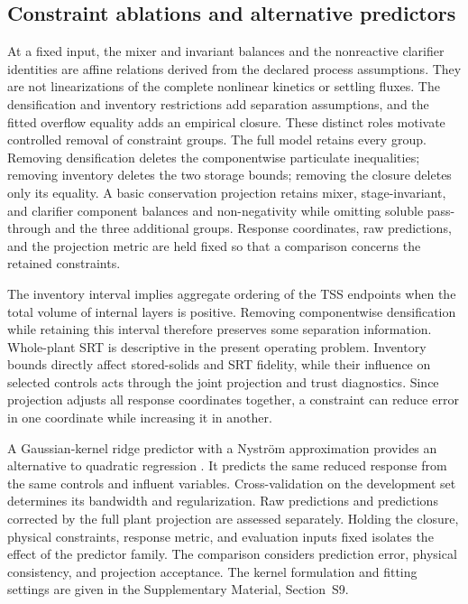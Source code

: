 \documentclass[a4paper,fleqn]{cas-sc}
\begin{document}
\subsection{Constraint ablations and alternative predictors}

At a fixed input, the mixer and invariant balances and the nonreactive clarifier identities are affine relations derived from the declared process assumptions. They are not linearizations of the complete nonlinear kinetics or settling fluxes. The densification and inventory restrictions add separation assumptions, and the fitted overflow equality adds an empirical closure. These distinct roles motivate controlled removal of constraint groups. The full model retains every group. Removing densification deletes the componentwise particulate inequalities; removing inventory deletes the two storage bounds; removing the closure deletes only its equality. A basic conservation projection retains mixer, stage-invariant, and clarifier component balances and non-negativity while omitting soluble pass-through and the three additional groups. Response coordinates, raw predictions, and the projection metric are held fixed so that a comparison concerns the retained constraints.

The inventory interval implies aggregate ordering of the TSS endpoints when the total volume of internal layers is positive. Removing componentwise densification while retaining this interval therefore preserves some separation information. Whole-plant SRT is descriptive in the present operating problem. Inventory bounds directly affect stored-solids and SRT fidelity, while their influence on selected controls acts through the joint projection and trust diagnostics. Since projection adjusts all response coordinates together, a constraint can reduce error in one coordinate while increasing it in another.

A Gaussian-kernel ridge predictor with a Nystr\"om approximation provides an alternative to quadratic regression \citep{WilliamsSeeger2001}. It predicts the same reduced response from the same controls and influent variables. Cross-validation on the development set determines its bandwidth and regularization. Raw predictions and predictions corrected by the full plant projection are assessed separately. Holding the closure, physical constraints, response metric, and evaluation inputs fixed isolates the effect of the predictor family. The comparison considers prediction error, physical consistency, and projection acceptance. The kernel formulation and fitting settings are given in the Supplementary Material, Section~S9.
\end{document}
